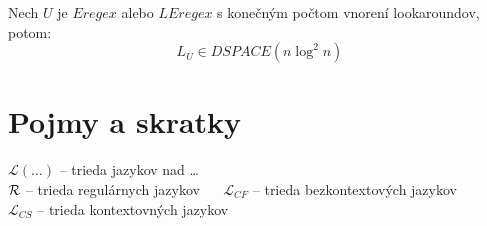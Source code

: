 \documentclass[myposter,portrait,plainboxedsections]{sciposter}
\def\R{{\cal R}} %
\def\L{\mathscr{L}} %
\def\e{Eregex}
\def\le{LEregex}
\def\mysection#1{
{\color{sectionCol}\section*{\sc\bfseries #1}}}
\begin{document}
\begin{multicols*}{3}
Nech $U$ je $\e$ alebo $\le$ s konečným počtom vnorení look\-aroundov, potom:
$$L_{U} \in DSPACE(n\log ^2 n)$$

\mysection{Pojmy a skratky}
$\L(\dots)$ -- trieda jazykov nad \dots
\\ $\R$ -- trieda regulárnych jazykov ~~ $\L_{CF}$ -- trieda bezkontextových jazykov
\\ $\L_{CS}$ -- trieda kontextovných jazykov


\nocite{*}


\end{multicols*}
\end{document}
